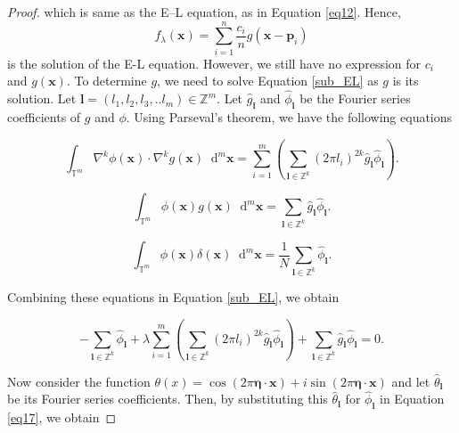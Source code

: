 \documentclass[multixcb]{amstext-l}
\theoremstyle{plain}
\theoremstyle{definition}
\theoremstyle{definition}
\theoremstyle{remark}
\numberwithin{equation}{chapter}
\begin{document}
\begin{proof}
which is same as the E--L equation, as in Equation \ref{eq12}. Hence, $$f_{\lambda}(\boldsymbol{x}) = \sum\limits_{i=1}^n \frac{c_i}{n}g(\boldsymbol{x}-\boldsymbol{p}_i)$$ is the solution of the E-L equation. However, we still have no expression for $c_i$ and $g(\boldsymbol{x})$. To determine $g$, we need to solve Equation \ref{sub_EL} as $g$ is its solution. Let $\boldsymbol{l} = (l_1,l_2,l_3,..l_m)\in \mathbb{Z}^m$. Let $\hat{g}_{\boldsymbol{l}}$ and $\hat{\phi}_{\boldsymbol{l}}$ be the Fourier series coefficients of $g$ and $\phi$. Using Parseval's theorem, we have the following equations

\begin{equation}\label{eq14}
\int_{\mathbb{T}^m}\nabla^k\phi(\boldsymbol{x})\cdot \nabla^k g(\boldsymbol{x}) \mathop{}\!\mathrm{d}^m\boldsymbol{x} = \sum\limits_{i = 1}^m( \sum\limits_{\boldsymbol{l} \in \mathbb{Z}^k}(2\pi l_i)^{2k}\hat{g}_{\boldsymbol{l}} \hat{\phi}_{\boldsymbol{l}}).
\end{equation}

\begin{equation}\label{eq15}
\int_{\mathbb{T}^m}\phi(\boldsymbol{x})g(\boldsymbol{x}) \mathop{}\!\mathrm{d}^m\boldsymbol{x} = \sum\limits_{\boldsymbol{l} \in \mathbb{Z}^k}\hat{g}_{\boldsymbol{l}} \hat{\phi}_{\boldsymbol{l}}.
\end{equation}

\begin{equation}\label{eq16}
    \int_{\mathbb{T}^m}\phi(\boldsymbol{x})\delta(\boldsymbol{x})\mathop{}\!\mathrm{d}^m\boldsymbol{x} = \frac{1}{N} \sum\limits_{\boldsymbol{l} \in \mathbb{Z}^k} \hat{\phi}_{\boldsymbol{l}}. 
\end{equation}

Combining these equations in Equation \ref{sub_EL}, we obtain 

\begin{equation}\label{eq17}
     -\sum\limits_{\boldsymbol{l} \in \mathbb{Z}^k} \hat{\phi}_{\boldsymbol{l}} + \lambda\sum\limits_{i = 1}^m( \sum\limits_{\boldsymbol{l} \in \mathbb{Z}^k}(2\pi l_i)^{2k}\hat{g}_{\boldsymbol{l}} \hat{\phi}_{\boldsymbol{l}}) + \sum\limits_{\boldsymbol{l} \in \mathbb{Z}^k}\hat{g}_{\boldsymbol{l}} \hat{\phi}_{\boldsymbol{l}} = 0 .
\end{equation}

Now consider the function $\theta(x) = \cos{(2\pi\boldsymbol{\eta}\cdot\boldsymbol{x})}+i\sin{(2\pi\boldsymbol{\eta}\cdot\boldsymbol{x})}$ and let $\hat{\theta}_{\boldsymbol{l}}$ be its Fourier series coefficients. Then, by substituting this $\hat{\theta}_{\boldsymbol{l}}$ for $\hat{\phi}_{\boldsymbol{l}}$ in Equation \ref{eq17}, we obtain 


\end{proof}
\end{document}
